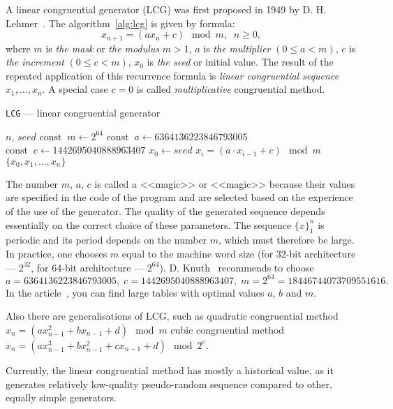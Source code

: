 \documentclass[%
floatfix,
showkeys,
nofootinbib, %
superscriptaddress, %
]{revtex4-1}
\newcommand{\const}{\mathrm{const}}
\begin{document}
A linear congruential generator (LCG) was first proposed in 1949 by
D. H. Lehmer~\cite{L_DKnuth:1997:en}. The
algorithm~\ref{alg:lcg} is given by formula:
\[
        x_{n+1} = (a x_{n} + c) \mod m,\;\; n \geqslant 0,
\]
where $m$ is \emph{the mask} or \emph{the modulus} $m > 1$, $a$ is
\emph{the multiplier} $(0 \leqslant a < m)$, $c$ is \emph{the
  increment} $(0 \leqslant c < m)$, $x_0$ is \emph{the seed} or
initial value. The result of the repeated application of this
recurrence formula is \textit{linear congruential sequence}
$x_{1},\ldots,x_{n}$. A special case $c=0$ is called
\emph{multiplicative} congruential method.

\begin{algorithm}[H]
  \caption{\texttt{LCG} --- linear congruential generator}\label{alg:lcg}
  \begin{algorithmic}
    \Require $n$, $seed$
    \State $\const\;\;m \leftarrow 2^{64}$
    \State $\const\;\;a \leftarrow 6364136223846793005$
    \State $\const\;\;c \leftarrow 1442695040888963407$
    \State $x_{0} \leftarrow seed$
      \State $x_{i} = (a \cdot x_{i-1} + c) \mod m$
    \EndFor
    \State \Return $\{x_{0}, x_{1}, \ldots, x_{n}\}$
  \end{algorithmic}
\end{algorithm}

The number $m$, $a$, $c$ is called a <<magic>> or <<magic>> because
their values are specified in the code of the program and are selected
based on the experience of the use of the generator. The quality of
the generated sequence depends essentially on the correct choice of
these parameters. The sequence $\{x\}^{n}_{1}$ is periodic and its
period depends on the number $m$, which must therefore be large. In
practice, one chooses $m$ equal to the machine word size (for 32-bit
architecture --- $2^{32}$, for 64-bit architecture ---
$2^{64}$). D. Knuth~\cite{L_DKnuth:1997:en} recommends to choose
\[
a=6364136223846793005,\; c=1442695040888963407,\; m=2^{64} = 18446744073709551616.
\]
In the article~\cite{L_Ecuyer:1999}, you can find large tables with
optimal values $a$, $b$ and $m$.

Also there are generalisations of LCG, such as quadratic congruential
method $x_{n} = ( a x_{n-1}^2 + b x_{n-1} + d ) \mod m$ cubic
congruential method
$x_{n} = ( a x_{n-1}^3 + b x_{n-1}^2 + c x_{n-1} + d )\mod 2^e$.

Currently, the linear congruential method has mostly a historical
value, as it generates relatively low-quality pseudo-random sequence
compared to other, equally simple generators.
\end{document}
